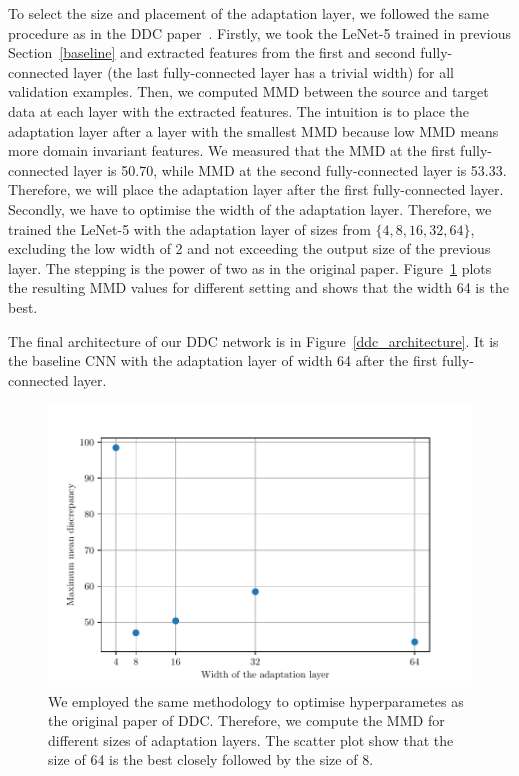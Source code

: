 To select the size and placement of the adaptation layer,
we followed the same procedure as in the DDC paper~\cite{tzeng2014}.
Firstly, we took the LeNet-5 trained in previous Section~\ref{baseline}
and extracted features from the first and second fully-connected layer
(the last fully-connected layer has a trivial width)
for all validation examples.
Then, we computed MMD between the source and target data at each layer with the extracted features.
The intuition is to place the adaptation layer after a layer with the smallest MMD
because low MMD means more domain invariant features.
We measured that the MMD at the first fully-connected layer is 50.70,
while MMD at the second fully-connected layer is 53.33.
Therefore, we will place the adaptation layer after the first fully-connected layer.
Secondly, we have to optimise the width of the adaptation layer.
Therefore, we trained the LeNet-5 with the adaptation layer of sizes
from \(\{4, 8, 16, 32, 64\}\), excluding the low width of 2
and not exceeding the output size of the previous layer.
The stepping is the power of two as in the original paper.
Figure~\ref{adaptation_layer} plots the resulting MMD values for different setting
and shows that the width 64 is the best.

The final architecture of our DDC network is in Figure~\ref{ddc_architecture}.
It is the baseline CNN with the adaptation layer of width 64
after the first fully-connected layer.

\begin{figure}
\includegraphics[width=\textwidth]{img/adaptation_layer_width.pdf}
\caption[Optimisation of the width of the adaptation layer]{
	We employed the same methodology to optimise hyperparametes as the original paper of DDC.
	Therefore, we compute the MMD for different sizes of adaptation layers.
	The scatter plot show that the size of 64 is the best closely followed by the size of 8.
}
\label{adaptation_layer}
\end{figure}


